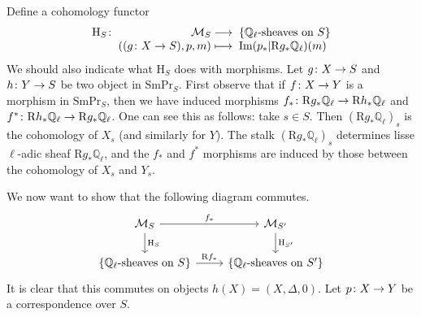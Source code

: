 \documentclass[a4paper,10pt]{article}
\def\smpr{\mathrm{SmPr}}
\def\coh{\mathrm{H}}
\begin{document}
Define a cohomology functor
\[
	\map[\coh_{S}]{\mathcal{M}_{S}}%
	{\{\text{$\mathbb{Q}_{\ell}$-sheaves on $S$}\}}%
	[\left((\map[g]{X}{S}),p,m\right)]%
	[\mathrm{Im}(p_{*}|\mathrm{R}g_{*}\mathbb{Q}_{\ell})(m)]
\]
We should also indicate what $\coh_{S}$ does with morphisms. Let
$\map[g]{X}{S}$ and $\map[h]{Y}{S}$ be two object in $\smpr_{S}$. First observe
that if $\map[f]{X}{Y}$ is a morphism in $\smpr_{S}$, then we have induced
morphisms
$\map[f_{*}]{\mathrm{R}g_{*}\mathbb{Q}_{\ell}}{\mathrm{R}h_{*}\mathbb{Q}_{\ell}}$
and
$\map[f^{*}]{\mathrm{R}h_{*}\mathbb{Q}_{\ell}}{\mathrm{R}g_{*}\mathbb{Q}_{\ell}}$.
One can see this as follows: take $s \in S$. Then
$(\mathrm{R}g_{*}\mathbb{Q}_{\ell})_{s}$ is the cohomology of $X_{s}$ (and
similarly for $Y$). The stalk $(\mathrm{R}g_{*}\mathbb{Q}_{\ell})_{s}$
determines lisse $\ell$-adic sheaf $\mathrm{R}g_{*}\mathbb{Q}_{\ell}$, and the
$f_{*}$ and $f^{*}$ morphisms are induced by those between the cohomology of
$X_{s}$ and $Y_{s}$.

We now want to show that the following diagram commutes.
\[
	\begin{tikzcd} %
		\mathcal{M}_{S} \rar{f_{*}} \dar{\coh_{S}}
		& \mathcal{M}_{S'} \dar{\coh_{S'}} \\
		\{\text{$\mathbb{Q}_{\ell}$-sheaves on $S$}\}
		\rar{\mathrm{R}f_{*}}
		& \{\text{$\mathbb{Q}_{\ell}$-sheaves on $S'$}\}
	\end{tikzcd} %
\]
It is clear that this commutes on objects $h(X) = (X, \Delta, 0)$. Let
$\map[p]{X}{Y}$ be a correspondence over $S$.
\end{document}

